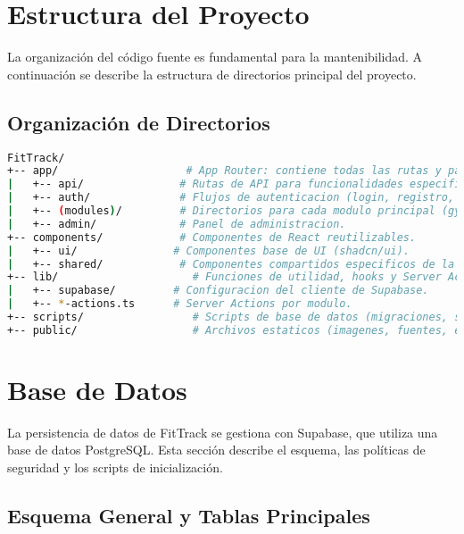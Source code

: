 \documentclass[12pt,a4paper]{article}
\begin{document}
\section{Estructura del Proyecto}

La organización del código fuente es fundamental para la mantenibilidad. A continuación se describe la estructura de directorios principal del proyecto.

\subsection{Organización de Directorios}

\begin{lstlisting}[language=bash, caption={Estructura de directorios principal}, label={lst:dir-structure}]
FitTrack/
+-- app/                    # App Router: contiene todas las rutas y paginas.
|   +-- api/               # Rutas de API para funcionalidades especificas.
|   +-- auth/              # Flujos de autenticacion (login, registro, etc.).
|   +-- (modules)/         # Directorios para cada modulo principal (gym, running, etc.).
|   +-- admin/             # Panel de administracion.
+-- components/            # Componentes de React reutilizables.
|   +-- ui/               # Componentes base de UI (shadcn/ui).
|   +-- shared/            # Componentes compartidos especificos de la aplicacion.
+-- lib/                     # Funciones de utilidad, hooks y Server Actions.
|   +-- supabase/         # Configuracion del cliente de Supabase.
|   +-- *-actions.ts      # Server Actions por modulo.
+-- scripts/                 # Scripts de base de datos (migraciones, seeds).
+-- public/                  # Archivos estaticos (imagenes, fuentes, etc.).
\end{lstlisting}

\section{Base de Datos}

La persistencia de datos de FitTrack se gestiona con Supabase, que utiliza una base de datos PostgreSQL. Esta sección describe el esquema, las políticas de seguridad y los scripts de inicialización.

\subsection{Esquema General y Tablas Principales}
\end{document}
